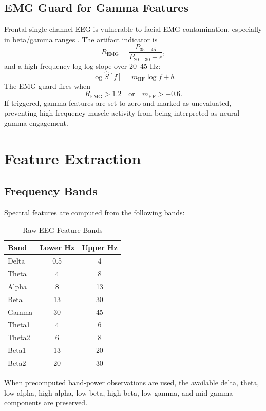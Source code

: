 \documentclass[conference]{IEEEtran}
\begin{document}
\subsection{EMG Guard for Gamma Features}
Frontal single-channel EEG is vulnerable to facial EMG contamination, especially in beta/gamma ranges \cite{whitham2007,goncharova2003}. The artifact indicator is
\begin{equation}
R_{\mathrm{EMG}}=\frac{P_{35-45}}{P_{20-30}+\epsilon},
\end{equation}
and a high-frequency log-log slope over 20--45 Hz:
\begin{equation}
\log \hat{S}[f] = m_{\mathrm{HF}}\log f + b .
\end{equation}
The EMG guard fires when
\begin{equation}
R_{\mathrm{EMG}}>1.2 \quad \mathrm{or} \quad m_{\mathrm{HF}}>-0.6 .
\end{equation}
If triggered, gamma features are set to zero and marked as unevaluated, preventing high-frequency muscle activity from being interpreted as neural gamma engagement.

\section{Feature Extraction}
\subsection{Frequency Bands}
Spectral features are computed from the following bands:
\begin{table}[h]
\centering
\caption{Raw EEG Feature Bands}
\begin{tabular}{lcc}
\toprule
Band & Lower Hz & Upper Hz\\
\midrule
Delta & 0.5 & 4\\
Theta & 4 & 8\\
Alpha & 8 & 13\\
Beta & 13 & 30\\
Gamma & 30 & 45\\
Theta1 & 4 & 6\\
Theta2 & 6 & 8\\
Beta1 & 13 & 20\\
Beta2 & 20 & 30\\
\bottomrule
\end{tabular}
\end{table}

When precomputed band-power observations are used, the available delta, theta, low-alpha, high-alpha, low-beta, high-beta, low-gamma, and mid-gamma components are preserved.
\end{document}
